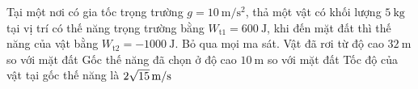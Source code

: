 \begin{ex}
	Tại một nơi có gia tốc trọng trường $g=\SI{10}{\meter/\second^2}$, thả một vật có khối lượng $\SI{5}{\kilogram}$ tại vị trí có thế năng trọng trường bằng $W_{\text{t1}}=\SI{600}{\joule}$, khi đến mặt đất thì thế năng của vật bằng $W_{\text{t2}}=\SI{-1000}{\joule}$. Bỏ qua mọi ma sát.
	{\True Vật đã rơi từ độ cao $\SI{32}{\meter}$ so với mặt đất} 
	{Gốc thế năng đã chọn ở độ cao $\SI{10}{\meter}$ so với mặt đất}
	{Tốc độ của vật tại gốc thế năng là $\xsi{2\sqrt{15}}{\meter/\second}$}
\end{ex}
